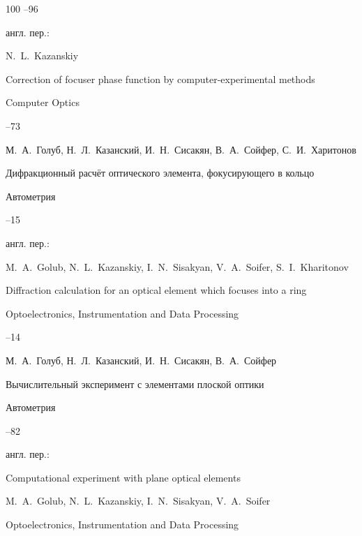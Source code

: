 \begin{thebibliography}{100}
--96

\transl англ. пер.:~

\by N.~L.~Kazanskiy  

\paper Correction of focuser phase function by computer-experimental methods 

\jour Computer Optics




--73




\by М.~А.~Голуб, Н.~Л.~Казанский, И.~Н.~Сисакян, В.~А.~Сойфер, С.~И.~Харитонов

\paper Дифракционный расчёт оптического элемента, фокусирующего в кольцо

\jour Автометрия



--15

\transl англ. пер.:~

\by M.~A.~Golub, N.~L.~Kazanskiy, I.~N.~Sisakyan, V.~A.~Soifer, S.~I.~Kharitonov

\paper Diffraction calculation for an optical element which focuses into a ring

\jour Optoelectronics, Instrumentation and Data Processing



--14








\by М.~А.~Голуб, Н.~Л.~Казанский, И.~Н.~Сисакян, В.~А.~Сойфер

\paper Вычислительный эксперимент с элементами плоской оптики

\jour Автометрия



--82

\transl англ. пер.:~

\paper Computational experiment with plane optical elements

\by M.~A.~Golub, N.~L.~Kazanskiy, I.~N.~Sisakyan, V.~A.~Soifer 

\jour Optoelectronics, Instrumentation and Data Processing


\end{thebibliography}
